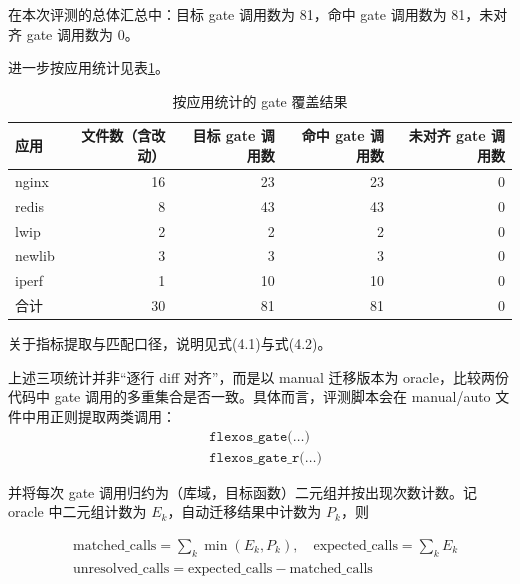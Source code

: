 \documentclass[UTF8,a4paper,12pt,twoside]{ctexart}  %
\begin{document}
在本次评测的总体汇总中：目标 gate 调用数为 81，命中 gate 调用数为
81，未对齐 gate 调用数为 0。

进一步按应用统计见表\ref{tab:gate-coverage-by-app}。
{\small
\setlength{\tabcolsep}{4pt}
\begin{longtable}{@{}lrrrr@{}}
  \caption{按应用统计的 gate 覆盖结果}\label{tab:gate-coverage-by-app} \\
  \toprule
  应用     & 文件数（含改动） & 目标 gate 调用数 & 命中 gate 调用数 & 未对齐
  gate 调用数                                                   \\
  \midrule
  \endhead
  \bottomrule
  \endlastfoot
  nginx  & 16       & 23          & 23          & 0          \\
  redis  & 8        & 43          & 43          & 0          \\
  lwip   & 2        & 2           & 2           & 0          \\
  newlib & 3        & 3           & 3           & 0          \\
  iperf  & 1        & 10          & 10          & 0          \\
  合计     & 30       & 81          & 81          & 0          \\
\end{longtable}
}

关于指标提取与匹配口径，说明见式(4.1)与式(4.2)。

上述三项统计并非``逐行 diff 对齐''，而是以 manual 迁移版本为
oracle，比较两份代码中 gate
调用的多重集合是否一致。具体而言，评测脚本会在 manual/auto
文件中用正则提取两类调用：
\begin{equation}
  \begin{aligned}
     & \texttt{flexos\_gate(\ldots)}    \\
     & \texttt{flexos\_gate\_r(\ldots)}
  \end{aligned}
\end{equation}

并将每次 gate 调用归约为（库域，目标函数）二元组并按出现次数计数。记
oracle 中二元组计数为 \(E_k\)，自动迁移结果中计数为 \(P_k\)，则

\begin{equation}
  \begin{aligned}
     & \text{matched\_calls}=\sum_k \min(E_k, P_k),\quad
    \text{expected\_calls}=\sum_k E_k                                        \\
     & \text{unresolved\_calls}=\text{expected\_calls}-\text{matched\_calls}
  \end{aligned}
\end{equation}
\end{document}

